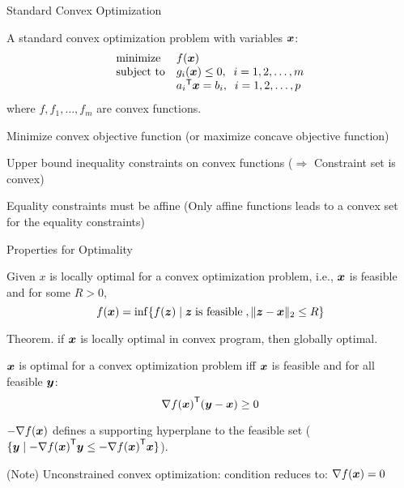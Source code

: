 \documentclass[handout,fleqn,aspectratio=169]{beamer}
\begin{document}
\begin{frame}{Standard Convex Optimization}

\plitemsep 0.1in

\bci 

\item A {\blue standard convex optimization} problem with variables $\bm{x}$:
\[
\begin{array}{ll}
\mbox{minimize} & f(\bm{x})\\
\mbox{subject to} & g_{i}(\bm{x})\leq 0, \;\; i=1,2,\ldots,m\\
& {a_{i}}^{\mathsf{T}}\bm{x}= b_{i}, \;\; i=1,2,\ldots,p
\end{array}
\]
where $f,f_{1},\ldots,f_{m}$ are convex functions.

\item {\red Minimize} {\blue convex} objective function (or
maximize concave objective function)

\item {\red Upper bound inequality} constraints on {\blue
convex} functions ($\Rightarrow$ Constraint set is convex)

\item {\red Equality} constraints must be {\blue affine} (Only affine functions leads to a convex set for the 
equality constraints)
\eci
\end{frame}


\begin{frame}{Properties for Optimality}

\plitemsep 0.05in

\bci 

\item {}

\bci

\item Given $x$ is {\red locally optimal} for a convex optimization problem, i.e., 
$\bm{x}$ is feasible and for some $R>0$,
\[
f(\bm{x}) = \inf\{f(\bm{z}) \mid \bm{z} \; \text{is feasible}\;,
\|\bm{z}-\bm{x}\|_{2}\leq R\}
\]

\item {\red Theorem.} if $\bm{x}$ is locally optimal in convex program, then
  globally optimal.

\eci

\item {}

\bci
\item $\bm{x}$ is optimal for a convex optimization problem iff $\bm{x}$ is
feasible and for all feasible $\bm{y}$:
\[
\nabla {f(\bm{x})}^{\mathsf{T}}(\bm{y}-\bm{x})\geq 0
\]

\item $-\nabla f(\bm{x})$ defines a supporting hyperplane to the feasible set
($\{ \bm{y} \mid - \nabla {f(\bm{x})}^{\mathsf{T}}\bm{y} \leq - \nabla {f(\bm{x})}^{\mathsf{T}}\bm{x} \}$). 

\item (Note) Unconstrained convex optimization: condition reduces to: $\nabla f(\bm{x})=0$

\eci
\eci
\end{frame}
\end{document}
